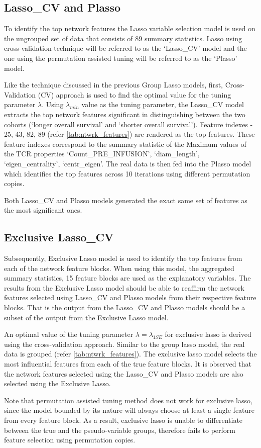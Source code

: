 \subsection{Lasso\_CV and Plasso}\label{subsec:plasso_cv}
To identify the top network features the Lasso variable selection model is used on the ungrouped set of data that consists of 89 summary statistics. Lasso using cross-validation technique will be referred to as the \lq Lasso\_CV' model and the one using the permutation assisted tuning will be referred to as the \lq Plasso' model.\par
Like the technique discussed in the previous Group Lasso models, first, Cross-Validation (CV) approach is used to find the optimal value for the tuning parameter $\lambda$. Using $\lambda_{min}$ value as the tuning parameter, the Lasso\_CV model extracts the top network features significant in distinguishing between the two cohorts (\lq longer overall survival' and \lq shorter overall survival'). Feature indexes - 25, 43, 82, 89 (refer \autoref{tab:ntwrk_features}) are rendered as the top features. These feature indexes correspond to the summary statistic of the Maximum values of the TCR properties \lq Count\_PRE\_INFUSION',
\lq diam\_length', \lq eigen\_centrality', \lq centr\_eigen'. The real data is then fed into the Plasso model which identifies the top features across 10 iterations using different permutation copies.\par
Both Lasso\_CV and Plasso models generated the exact same set of features as the most significant ones.
\subsection{Exclusive Lasso\_CV}\label{subsec:exclusvlasso_cv}
Subsequently, Exclusive Lasso model is used to identify the top features from each of the network feature blocks. When using this model, the aggregated summary statistics, 15 feature blocks are used as the explanatory variables. The results from the Exclusive Lasso model should be able to reaffirm the network features selected using Lasso\_CV and Plasso models from their respective feature blocks. That is the output from the Lasso\_CV and Plasso models should be a subset of the output from the Exclusive Lasso model.\par
An optimal value of the tuning parameter $\lambda=\lambda_{1SE}$ for exclusive lasso is derived using the cross-validation approach. Similar to the group lasso model, the real data is grouped (refer \autoref{tab:ntwrk_features}). The exclusive lasso model selects the most influential features from each of the true feature blocks. It is observed that the network features selected using the Lasso\_CV and Plasso models are also selected using the Exclusive Lasso.\par
Note that permutation assisted tuning method does not work for exclusive lasso, since the model bounded by its nature will always choose at least a single feature from every feature block. As a result, exclusive lasso is unable to differentiate between the true and the pseudo-variable groups, therefore fails to perform feature selection using permutation copies.



